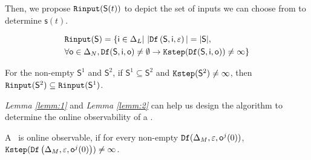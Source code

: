 Then, we propose ${\tt Rinput}(\mathsf{S}(t))$ to depict the set of inputs we can choose from to determine $\mathsf{s}(t)$.

\begin{definition}[$\Ri(\mathsf{S})$] 
\begin{equation*}
\begin{split}
&{\tt Rinput}(\mathsf{S})=\{\mathsf{i}\in \Delta_L|\  |{\tt Df}\left(\mathsf{S},\mathsf{i},\varepsilon\right)|=|\mathsf{S}|, \\
& \forall \mathsf{o} \in \Delta_N, {\tt Df}(\mathsf{S},\mathsf{i},\mathsf{o})\ne \emptyset \rightarrow {\tt Kstep}({\tt Df}(\mathsf{S},\mathsf{i},\mathsf{o}))\ne \infty\}
\end{split}
\end{equation*}
\end{definition}
\begin{lemma}
For the non-empty $\mathsf{S}^{1}$ and $\mathsf{S}^{2}$, if $\mathsf{S}^{1}\subseteq\mathsf{S}^{2}$ and ${\tt Kstep}(\mathsf{S}^{2})\ne\infty$, then ${\tt Rinput}(\mathsf{S}^2)\subseteq{\tt Rinput}(\mathsf{S}^1)$.
\label{lemm:2}
\end{lemma}

{\em Lemma \ref{lemm:1}} and {\em Lemma \ref{lemm:2}} can help us design the algorithm to determine the online observability of a \BCN.%


\begin{definition}
 A \BCN\ is online observable,
if for every non-empty ${\tt Df}(\Delta_M,\varepsilon, \mathsf{o}^{j}(0))$, ${\tt Kstep}({\tt Df}\left(\Delta_M,\varepsilon,\mathsf{o}^{j}(0)\right))\ne\infty$.
\end{definition}


